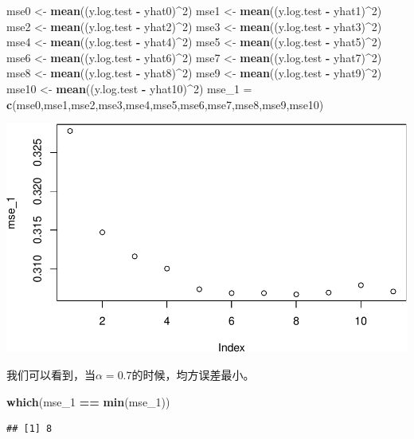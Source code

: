 \documentclass[]{article}
\newenvironment{Shaded}{\begin{snugshade}}{\end{snugshade}}
\newcommand{\KeywordTok}[1]{\textcolor[rgb]{0.13,0.29,0.53}{\textbf{#1}}}
\newcommand{\DecValTok}[1]{\textcolor[rgb]{0.00,0.00,0.81}{#1}}
\newcommand{\StringTok}[1]{\textcolor[rgb]{0.31,0.60,0.02}{#1}}
\newcommand{\OperatorTok}[1]{\textcolor[rgb]{0.81,0.36,0.00}{\textbf{#1}}}
\newcommand{\NormalTok}[1]{#1}
\begin{document}
\begin{Shaded}
\begin{Highlighting}[]
\NormalTok{mse0 <-}\StringTok{ }\KeywordTok{mean}\NormalTok{((y.log.test }\OperatorTok{-}\StringTok{ }\NormalTok{yhat0)}\OperatorTok{^}\DecValTok{2}\NormalTok{)}
\NormalTok{mse1 <-}\StringTok{ }\KeywordTok{mean}\NormalTok{((y.log.test }\OperatorTok{-}\StringTok{ }\NormalTok{yhat1)}\OperatorTok{^}\DecValTok{2}\NormalTok{)}
\NormalTok{mse2 <-}\StringTok{ }\KeywordTok{mean}\NormalTok{((y.log.test }\OperatorTok{-}\StringTok{ }\NormalTok{yhat2)}\OperatorTok{^}\DecValTok{2}\NormalTok{)}
\NormalTok{mse3 <-}\StringTok{ }\KeywordTok{mean}\NormalTok{((y.log.test }\OperatorTok{-}\StringTok{ }\NormalTok{yhat3)}\OperatorTok{^}\DecValTok{2}\NormalTok{)}
\NormalTok{mse4 <-}\StringTok{ }\KeywordTok{mean}\NormalTok{((y.log.test }\OperatorTok{-}\StringTok{ }\NormalTok{yhat4)}\OperatorTok{^}\DecValTok{2}\NormalTok{)}
\NormalTok{mse5 <-}\StringTok{ }\KeywordTok{mean}\NormalTok{((y.log.test }\OperatorTok{-}\StringTok{ }\NormalTok{yhat5)}\OperatorTok{^}\DecValTok{2}\NormalTok{)}
\NormalTok{mse6 <-}\StringTok{ }\KeywordTok{mean}\NormalTok{((y.log.test }\OperatorTok{-}\StringTok{ }\NormalTok{yhat6)}\OperatorTok{^}\DecValTok{2}\NormalTok{)}
\NormalTok{mse7 <-}\StringTok{ }\KeywordTok{mean}\NormalTok{((y.log.test }\OperatorTok{-}\StringTok{ }\NormalTok{yhat7)}\OperatorTok{^}\DecValTok{2}\NormalTok{)}
\NormalTok{mse8 <-}\StringTok{ }\KeywordTok{mean}\NormalTok{((y.log.test }\OperatorTok{-}\StringTok{ }\NormalTok{yhat8)}\OperatorTok{^}\DecValTok{2}\NormalTok{)}
\NormalTok{mse9 <-}\StringTok{ }\KeywordTok{mean}\NormalTok{((y.log.test }\OperatorTok{-}\StringTok{ }\NormalTok{yhat9)}\OperatorTok{^}\DecValTok{2}\NormalTok{)}
\NormalTok{mse10 <-}\StringTok{ }\KeywordTok{mean}\NormalTok{((y.log.test }\OperatorTok{-}\StringTok{ }\NormalTok{yhat10)}\OperatorTok{^}\DecValTok{2}\NormalTok{)}
\NormalTok{mse_}\DecValTok{1}\NormalTok{ =}\StringTok{ }\KeywordTok{c}\NormalTok{(mse0,mse1,mse2,mse3,mse4,mse5,mse6,mse7,mse8,mse9,mse10)}
\end{Highlighting}
\end{Shaded}

\includegraphics{FinalProjectForRegressionAnalysis_files/figure-latex/unnamed-chunk-44-1.pdf}

我们可以看到，当\(\alpha = 0.7\)的时候，均方误差最小。

\begin{Shaded}
\begin{Highlighting}[]
\KeywordTok{which}\NormalTok{(mse_}\DecValTok{1} \OperatorTok{==}\StringTok{ }\KeywordTok{min}\NormalTok{(mse_}\DecValTok{1}\NormalTok{))}
\end{Highlighting}
\end{Shaded}

\begin{verbatim}
## [1] 8
\end{verbatim}
\end{document}
